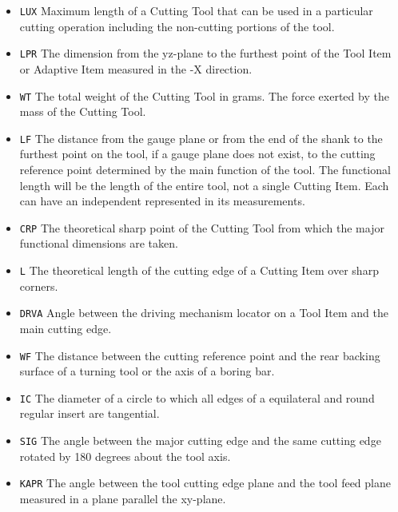 \begin{itemize}
\begin{itemize}
\item \texttt{LUX} \newline Maximum length of a Cutting Tool that can be used in a particular cutting operation including the non-cutting portions of the tool. 
\item \texttt{LPR} \newline The dimension from the yz-plane to the furthest point of the Tool Item or Adaptive Item measured in the -X direction. 
\item \texttt{WT} \newline The total weight of the Cutting Tool in grams. The force exerted by the mass of the Cutting Tool. 
\item \texttt{LF} \newline The distance from the gauge plane or from the end of the shank to the furthest point on the tool, if a gauge plane does not exist, to the cutting reference point determined by the main function of the tool. The  functional length will be the length of the entire tool, not a single Cutting Item. Each  can have an independent  represented in its measurements.  
\item \texttt{CRP} \newline The theoretical sharp point of the Cutting Tool from which the major functional dimensions are taken. 
\item \texttt{L} \newline The theoretical length of the cutting edge of a Cutting Item over sharp corners. 
\item \texttt{DRVA} \newline Angle between the driving mechanism locator on a Tool Item and the main cutting edge. 
\item \texttt{WF} \newline The distance between the cutting reference point and the rear backing surface of a turning tool or the axis of a boring bar. 
\item \texttt{IC} \newline The diameter of a circle to which all edges of a equilateral and round regular insert are tangential. 
\item \texttt{SIG} \newline The angle between the major cutting edge and the same cutting edge rotated by 180 degrees about the tool axis. 
\item \texttt{KAPR} \newline The angle between the tool cutting edge plane and the tool feed plane measured in a plane parallel the xy-plane. 

\end{itemize}
\end{itemize}
